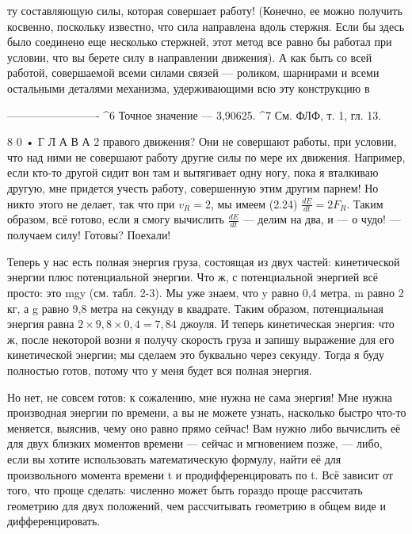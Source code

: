 \documentclass[10pt,oneside]{article}
\begin{document}
ту составляющую силы, которая совершает работу! (Конечно, ее можно получить косвенно, поскольку известно, что сила направлена вдоль стержня. Если бы здесь было соединено еще несколько стержней, этот метод все равно бы работал при условии, что вы берете силу в направлении движения). А как быть со всей работой, совершаемой всеми силами связей --- роликом, шарнирами и всеми остальными деталями механизма, удерживающими всю эту конструкцию в\par

------------------------- \textasciicircum{}6 Точное значение --- 3,90625. \textasciicircum{}7 См. ФЛФ, т. 1, гл. 13.\par

8 0 • Г Л А В А  2 правого движения? Они не совершают работы, при условии, что над ними не совершают работу другие силы по мере их движения. Например, если кто-то другой сидит вон там и вытягивает одну ногу, пока я вталкиваю другую, мне придется учесть работу, совершенную этим другим парнем! Но никто этого не делает, так что при \(v_R = 2\), мы имеем (2.24) \(\frac{dE}{dt} = 2F_R\). Таким образом, всё готово, если я смогу вычислить \(\frac{dE}{dt}\) --- делим на два, и --- о чудо! --- получаем силу! Готовы? Поехали!\par

Теперь у нас есть полная энергия груза, состоящая из двух частей: кинетической энергии плюс потенциальной энергии. Что ж, с потенциальной энергией всё просто: это mgy (см. табл. 2-3). Мы уже знаем, что y равно 0,4 метра, m равно 2 кг, а g равно 9,8 метра на секунду в квадрате. Таким образом, потенциальная энергия равна \(2 \times 9,8 \times 0,4 = 7,84\) джоуля. И теперь кинетическая энергия: что ж, после некоторой возни я получу скорость груза и запишу выражение для его кинетической энергии; мы сделаем это буквально через секунду. Тогда я буду полностью готов, потому что у меня будет вся полная энергия.\par

Но нет, не совсем готов: к сожалению, мне нужна не сама энергия! Мне нужна производная энергии по времени, а вы не можете узнать, насколько быстро что-то меняется, выяснив, чему оно равно прямо сейчас! Вам нужно либо вычислить её для двух близких моментов времени --- сейчас и мгновением позже, --- либо, если вы хотите использовать математическую формулу, найти её для произвольного момента времени t и продифференцировать по t. Всё зависит от того, что проще сделать: численно может быть гораздо проще рассчитать геометрию для двух положений, чем рассчитывать геометрию в общем виде и дифференцировать.\par
\end{document}
